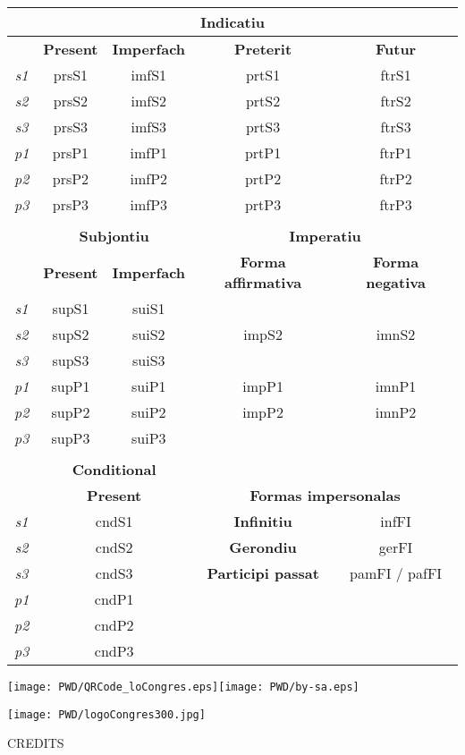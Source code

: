 \documentclass[10pt,a4paper,final]{article}
\begin{document}
\begin{tabular}{|c|c|c|c|c|}
\hline 
\multicolumn{5}{|c|}{\textbf{Indicatiu}} \\ 
\hline 
 & \textbf{Present} & \textbf{Imperfach} & \textbf{Preterit} & \textbf{Futur} \\ 
\hline 
\textit{s1} & prsS1 & imfS1 & prtS1 & ftrS1 \\ 
\hline 
\textit{s2} & prsS2 & imfS2 & prtS2 & ftrS2 \\ 
\hline 
\textit{s3} & prsS3 & imfS3 & prtS3 & ftrS3 \\ 
\hline 
\textit{p1} & prsP1 & imfP1 & prtP1 & ftrP1 \\ 
\hline 
\textit{p2} & prsP2 & imfP2 & prtP2 & ftrP2 \\ 
\hline 
\textit{p3} & prsP3 & imfP3 & prtP3 & ftrP3 \\ 
\hline 
\multicolumn{5}{|c|}{} \\ 
\hline 
 & \multicolumn{2}{c|}{\textbf{Subjontiu}}  & \multicolumn{2}{c|}{\textbf{Imperatiu}} \\ 
\hline 
 & \textbf{Present} & \textbf{Imperfach} & \textbf{Forma affirmativa} & \textbf{Forma negativa} \\ 
\hline 
\textit{s1} & supS1 & suiS1 & \multicolumn{2}{c|}{} \\ 
\hline 
\textit{s2} & supS2 & suiS2 & impS2 & imnS2 \\ 
\hline 
\textit{s3} & supS3 & suiS3 & \multicolumn{2}{c|}{} \\ 
\hline 
\textit{p1} & supP1 & suiP1 & impP1 & imnP1 \\ 
\hline 
\textit{p2} & supP2 & suiP2 & impP2 & imnP2 \\ 
\hline 
\textit{p3} & supP3 & suiP3 & \multicolumn{2}{c|}{} \\ 
\hline 
\multicolumn{5}{|c|}{} \\ 
\hline 
 & \multicolumn{2}{c|}{\textbf{Conditional}} & \multicolumn{2}{c|}{} \\ 
\hline 
 &  \multicolumn{2}{c|}{\textbf{Present}} & \multicolumn{2}{c|}{\textbf{Formas impersonalas}}  \\ 
\hline 
\textit{s1} & \multicolumn{2}{c|}{cndS1}  & \textbf{Infinitiu} & infFI \\ 
\hline 
\textit{s2} & \multicolumn{2}{c|}{cndS2}  & \textbf{Gerondiu} & gerFI \\ 
\hline 
\textit{s3} & \multicolumn{2}{c|}{cndS3}  & \textbf{Participi passat} & pamFI / pafFI \\ 
\hline 
\textit{p1} & \multicolumn{2}{c|}{cndP1} & \multicolumn{2}{c|}{} \\ 
\hline 
\textit{p2} & \multicolumn{2}{c|}{cndP2} & \multicolumn{2}{c|}{} \\ 
\hline 
\textit{p3} & \multicolumn{2}{c|}{cndP3} & \multicolumn{2}{c|}{} \\ 
\hline 
\end{tabular}

\texttt{[image: PWD/QRCode\_loCongres.eps]}\hfill\texttt{[image: PWD/by-sa.eps]}

\begin{center}
\texttt{[image: PWD/logoCongres300.jpg]}
\end{center}

\footnotesize{CREDITS}
\end{document}
